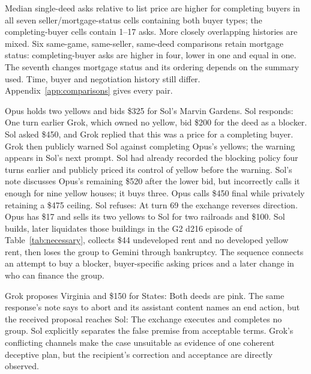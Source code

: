 Median single-deed asks relative to list price are higher for completing buyers in all seven seller/mortgage-status cells containing both buyer types; the completing-buyer cells contain 1--17 asks. More closely overlapping histories are mixed. Six same-game, same-seller, same-deed comparisons retain mortgage status: completing-buyer asks are higher in four, lower in one and equal in one. The seventh changes mortgage status and its ordering depends on the summary used. Time, buyer and negotiation history still differ. Appendix~\ref{app:comparisons} gives every pair.

Opus holds two yellows and bids \$325 for Sol's Marvin Gardens. Sol responds:
One turn earlier Grok, which owned no yellow, bid \$200 for the deed as a blocker. Sol asked \$450, and Grok replied that this was a price for a completing buyer. Grok then publicly warned Sol against completing Opus's yellows; the warning appears in Sol's next prompt. Sol had already recorded the blocking policy four turns earlier and publicly priced its control of yellow before the warning. Sol's note discusses Opus's remaining \$520 after the lower bid, but incorrectly calls it enough for nine yellow houses; it buys three. Opus calls \$450 final while privately retaining a \$475 ceiling. Sol refuses:
At turn 69 the exchange reverses direction. Opus has \$17 and sells its two yellows to Sol for two railroads and \$100. Sol builds, later liquidates those buildings in the G2 d216 episode of Table~\ref{tab:necessary}, collects \$44 undeveloped rent and no developed yellow rent, then loses the group to Gemini through bankruptcy. The sequence connects an attempt to buy a blocker, buyer-specific asking prices and a later change in who can finance the group.

Grok proposes Virginia and \$150 for States:
Both deeds are pink. The same response's note says to abort and its assistant content names an end action, but the received proposal reaches Sol:
The exchange executes and completes no group. Sol explicitly separates the false premise from acceptable terms. Grok's conflicting channels make the case unsuitable as evidence of one coherent deceptive plan, but the recipient's correction and acceptance are directly observed.
